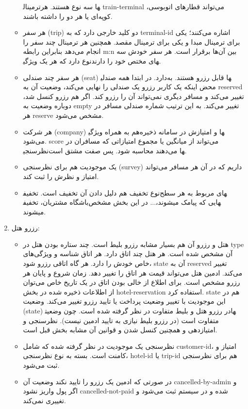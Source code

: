 \begin{enumerate}
\begin{itemize}
		ترمینال‎ها سه نوع هستند. هر train-terminal می‌تواند قطارهای اتوبوسی، کوپه‌ای یا هر دو را داشته باشند.
		\item 
		هر سفر (trip) دو کلید خارجی دارد که به terminal-id اشاره می‌کنند؛ یکی برای ترمینال مبدا و یکی برای ترمینال مقصد. همچنین هر ترمینال چند سفر را انجام می‌دهد بنابراین رابطه m:n بین آن‌ها برقرار است. هر سفر خودش سه نوع دارد که هر یک ویژگی‎های مختص خود را دارند.
		\item 
		هر سفر چند صندلی (seat) دارد. در ابتدا همه صندلی‎ها قابل رزرو هستند. به محض اینکه یک کاربر رزرو یک صندلی را نهایی می‌کند، وضعیت آن به reserved تغییر می‌کند و مسافر دیگری نمی‌تواند آن را رزرو کند. اگر هم رزرو کنسل شد، دوباره وضعیت به empty تغییر می‌کند. به این ترتیب شماره صندلی مسافر در هر reserve مشخص می‌شود.
		\item 
		هر شرکت (company) هم به همراه ویژگی‎ها و امتیازش در سامانه ذخیره می‌شود. score می‌تواند از میانگین یا مجموع امتیازاتی که مسافران در نظرسنجی‎ها می‌دهند محاسبه شود. پس صفت مشتق است.
		\item 
		یک موجودیت هم برای نظرسنجی (survey) داریم که در آن هر مسافر می‌تواند امتیاز و نظرش را ثبت کند.
		\item 
		نوع تخفیف هم دلیل دادن آن تخفیف است. تخفیف‎های مربوط به هر سطح باشگاه مشتریان، تخفیف‎هایی که پیامک میشوند،... در این بخش مشخص میشوند.
	\end{itemize}
	\item رزرو هتل:
	\begin{itemize}
		\item 
		هتل و رزرو آن هم بسیار مشابه رزرو بلیط است. چند ستاره بودن هتل در type آن مشخص شده است. هر هتل چند اتاق دارد. هر اتاق شناسه و ویژگی‌های خاص خودش را دارد. هر گاه اتاقی رزرو شود، state آن به reserved تغییر می‌کند. ادمین هتل می‌تواند قیمت هر اتاق را تغییر دهد. زمان شروع و پایان هر رزرو مشخص است. برای اطلاع از خالی بودن اتاق در یک تاریخ خاص می‌توان از اطلاعات ذخیره شده در بخش hotel-reservation استفاده کرد. state هم در این موجودیت با تغییر وضعیت پرداخت یا تایید رزرو تغییر می‌کند.
		وضعیت (state) در رزرو هتل و بلیط متفاوت در نظر گرفته شده‌ است. چون وضعیت‎ها متفاوت است (در رزرو بلیط نیازی به تایید ادمین نیست).
		نظرسنجی و امتیازدهی و همچنین کنسل شدن و قوانین آن مشابه بخش قبل است.
		\item 
		نظرسنجی یک موجودیت در نظر گرفته شده که شامل customer-id، امتیاز و کامنت است. بسته به نوع نظرسنجی، hotel-id یا trip-id هم برای نظرسنجی ثبت می‌شود.
		\item 
در صورتی که ادمین یک رزرو را تایید نکند وضعیت آن cancelled-by-admin و اگر پول واریز نشود cancelled-not-paid شده و در سیستم ثبت می‌شود و تغییری نمی‌کند.

\end{itemize}
\end{enumerate}
